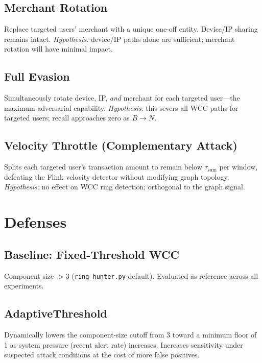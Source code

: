 \documentclass[sigconf,nonacm]{acmart}
\newcommand{\wcc}{\textsc{WCC}\xspace}
\begin{document}
\subsection{Merchant Rotation}
Replace targeted users' merchant with a unique one-off entity.  Device/IP
sharing remains intact.  \emph{Hypothesis:} device/IP paths alone are
sufficient; merchant rotation will have minimal impact.

\subsection{Full Evasion}
Simultaneously rotate device, IP, \emph{and} merchant for each targeted
user---the maximum adversarial capability.  \emph{Hypothesis:} this severs
all \wcc paths for targeted users; recall approaches zero as $B \to N$.

\subsection{Velocity Throttle (Complementary Attack)}
Splits each targeted user's transaction amount to remain below
$\tau_{\mathrm{sum}}$ per window, defeating the Flink velocity detector
without modifying graph topology.  \emph{Hypothesis:} no effect on \wcc
ring detection; orthogonal to the graph signal.

\section{Defenses}

\subsection{Baseline: Fixed-Threshold WCC}
Component size $> 3$ (\texttt{ring\_hunter.py} default).  Evaluated as
reference across all experiments.

\subsection{AdaptiveThreshold}
Dynamically lowers the component-size cutoff from 3 toward a minimum floor
of 1 as system pressure (recent alert rate) increases.  Increases sensitivity
under suspected attack conditions at the cost of more false positives.
\end{document}
